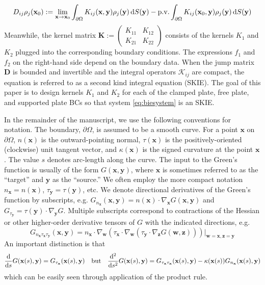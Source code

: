 \documentclass[preprint,12pt,3p]{elsarticle}
\newcommand{\dd}{ {\rm d} }
\newcommand{\pv}{\operatorname{p.\!v.}}
\newcommand{\bx}{{\mathbf{x}}}
\newcommand{\by}{{\mathbf{y}}}
\begin{document}
    \begin{align}
        D_{ij} \rho_j(\mathbf{x}_0) :=  \lim_{\mathbf{x} \rightarrow \mathbf{x}_0} \int_{\partial\Omega} K_{ij}(\mathbf{x},\mathbf{y}) \rho_j(\mathbf{y}) \, \dd S(\mathbf{y}) - \pv \int_{\partial\Omega} K_{ij}(\mathbf{x}_0,\mathbf{y}) \rho_j(\mathbf{y}) \, \dd S(\mathbf{y})
    \end{align}
    Meanwhile, the kernel matrix $\mathbf{K} := \begin{pmatrix}
    K_{11} & K_{12} \\
    K_{21} & K_{22}
    \end{pmatrix} $ consists of the kernels $K_1$ and $K_2$ plugged into the corresponding boundary conditions. The expressions $f_1$ and $f_2$ on the right-hand side depend on the boundary data. When the jump matrix $\mathbf{D}$ is bounded and invertible and the integral
    operators $\mathcal{K}_{ij}$ are compact, the equation is referred to as a second kind integral equation (SKIE). 
    The goal of this paper is to design kernels $K_1$ and $K_2$ for each of the clamped plate, free plate, and supported
    plate BCs so that system \eqref{eq:biesystem} is an SKIE. 
    
In the remainder of the manuscript, we use the following conventions for notation. 
The boundary, $\partial \Omega$, is assumed to be a smooth curve. 
For a point $\bx$ on $\partial \Omega$, $n(\bx)$ is the outward-pointing normal,
$\tau(\bx)$ is the positively-oriented (clockwise) unit tangent vector, and $\kappa(\bx)$ is 
the signed curvature at the point $\bx$. The value $s$ denotes arc-length along the curve. 
The input to the Green's function is usually of the form $G(\bx,\by)$, where $\bx$ is 
sometimes referred to as the ``target'' and $\by$ as the ``source.'' We often employ the 
more compact notation $n_\mathbf{x} = n(\bx)$, $\tau_\mathbf{y}=\tau(\by)$, etc. We denote directional derivatives of the Green's function by subscripts, e.g. 
$G_{n_\bx}(\bx,\by) = n(\bx) \cdot \nabla_\mathbf{x} G(\bx,\by)$ and $G_{\tau_\by} = \tau(\by) \cdot \nabla_\by G$. 
Multiple subscripts correspond to contractions of the Hessian or other higher-order
derivative tensors of $G$ with the indicated directions, e.g. 
\begin{equation}
    G_{n_\bx \tau_\bx \tau_\by}(\bx,\by) = n_\bx \cdot \nabla_\mathbf{w} \left ( \tau_\bx \cdot \nabla_\mathbf{w} \left ( \tau_\by \cdot \nabla_\mathbf{z} G(\mathbf{w},\mathbf{z})
    \right ) \right )  |_{\mathbf{w}=\bx,\mathbf{z}=\by} 
\end{equation}
An important distinction is that
\begin{equation}
\frac{\dd}{\dd s} G(\bx(s),\by) = G_{\tau_\bx}(\bx(s),\by) \quad \textrm{but} \quad 
\frac{\dd^2}{\dd s^2} G(\bx(s),\by) = G_{\tau_\bx \tau_\bx}(\bx(s),\by) -
\kappa(\bx(s)) G_{n_\bx}(\bx(s),\by)
\end{equation}
which can be easily seen through application of the product rule. 
\end{document}
